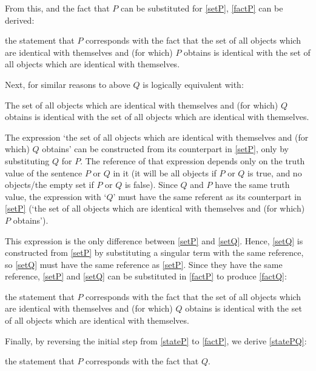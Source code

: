 From this, and the fact that $P$ can be substituted for \ref{setP}, \ref{factP} can be derived:

	\begin{example}\label{factP}
	the statement that $P$ corresponds with the fact that the set of all objects which are identical with themselves and (for which) $P$ obtains is identical with the set of all objects which are identical with themselves.
	\end{example}

Next, for similar reasons to above $Q$ is logically equivalent with:

	\begin{example}\label{setQ}
	The set of all objects which are identical with themselves and (for which) $Q$ obtains is identical with the set of all objects which are identical with themselves.
	\end{example}

The expression `the set of all objects which are identical with themselves and (for which) $Q$ obtains' can be constructed from its counterpart in \ref{setP}, only by substituting $Q$ for $P$.
The reference of that expression depends only on the truth value of the sentence $P$ or $Q$ in it (it will be all objects if $P$ or $Q$ is true, and no objects/the empty set if $P$ or $Q$ is false).
Since $Q$ and $P$ have the same truth value, the expression with `$Q$' must have the same referent as its counterpart in \ref{setP} (`the set of all objects which are identical with themselves and (for which) $P$ obtains').

This expression is the only difference between \ref{setP} and \ref{setQ}.
Hence, \ref{setQ} is constructed from \ref{setP} by substituting a singular term with the same reference, so \ref{setQ} must have the same reference as \ref{setP}.
Since they have the same reference, \ref{setP} and \ref{setQ} can be substituted in \ref{factP} to produce \ref{factQ}:

	\begin{example}\label{factQ}
	the statement that $P$ corresponds with the fact that the set of all objects which are identical with themselves and (for which) $Q$ obtains is identical with the set of all objects which are identical with themselves.
	\end{example}

Finally, by reversing the initial step from \ref{stateP} to \ref{factP}, we derive \ref{statePQ}:

	\begin{example}\label{statePQ}
	the statement that $P$ corresponds with the fact that $Q$.
	\end{example}

